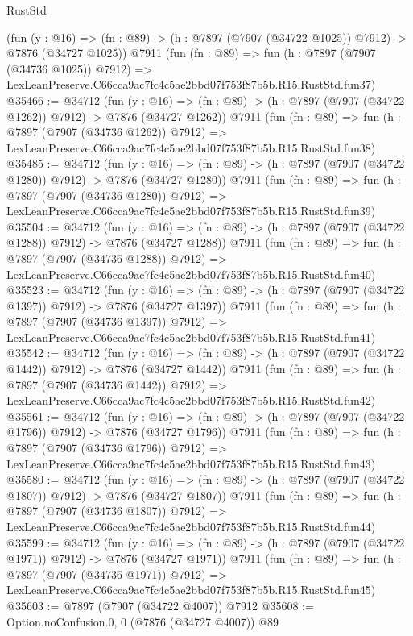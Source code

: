 \begin{lexlean}{RustStd}
\begin{coremodule}
    (fun (y : @16) =>
    (fn : @89) -> (h : @7897 (@7907 (@34722 @1025)) @7912) -> @7876 (@34727 @1025))
    @7911
    (fun (fn : @89) =>
    fun (h : @7897 (@7907 (@34736 @1025)) @7912) =>
    LexLeanPreserve.C66cca9ac7fc4c5ae2bbd07f753f87b5b.R15.RustStd.fun37)
@35466 := @34712
    (fun (y : @16) =>
    (fn : @89) -> (h : @7897 (@7907 (@34722 @1262)) @7912) -> @7876 (@34727 @1262))
    @7911
    (fun (fn : @89) =>
    fun (h : @7897 (@7907 (@34736 @1262)) @7912) =>
    LexLeanPreserve.C66cca9ac7fc4c5ae2bbd07f753f87b5b.R15.RustStd.fun38)
@35485 := @34712
    (fun (y : @16) =>
    (fn : @89) -> (h : @7897 (@7907 (@34722 @1280)) @7912) -> @7876 (@34727 @1280))
    @7911
    (fun (fn : @89) =>
    fun (h : @7897 (@7907 (@34736 @1280)) @7912) =>
    LexLeanPreserve.C66cca9ac7fc4c5ae2bbd07f753f87b5b.R15.RustStd.fun39)
@35504 := @34712
    (fun (y : @16) =>
    (fn : @89) -> (h : @7897 (@7907 (@34722 @1288)) @7912) -> @7876 (@34727 @1288))
    @7911
    (fun (fn : @89) =>
    fun (h : @7897 (@7907 (@34736 @1288)) @7912) =>
    LexLeanPreserve.C66cca9ac7fc4c5ae2bbd07f753f87b5b.R15.RustStd.fun40)
@35523 := @34712
    (fun (y : @16) =>
    (fn : @89) -> (h : @7897 (@7907 (@34722 @1397)) @7912) -> @7876 (@34727 @1397))
    @7911
    (fun (fn : @89) =>
    fun (h : @7897 (@7907 (@34736 @1397)) @7912) =>
    LexLeanPreserve.C66cca9ac7fc4c5ae2bbd07f753f87b5b.R15.RustStd.fun41)
@35542 := @34712
    (fun (y : @16) =>
    (fn : @89) -> (h : @7897 (@7907 (@34722 @1442)) @7912) -> @7876 (@34727 @1442))
    @7911
    (fun (fn : @89) =>
    fun (h : @7897 (@7907 (@34736 @1442)) @7912) =>
    LexLeanPreserve.C66cca9ac7fc4c5ae2bbd07f753f87b5b.R15.RustStd.fun42)
@35561 := @34712
    (fun (y : @16) =>
    (fn : @89) -> (h : @7897 (@7907 (@34722 @1796)) @7912) -> @7876 (@34727 @1796))
    @7911
    (fun (fn : @89) =>
    fun (h : @7897 (@7907 (@34736 @1796)) @7912) =>
    LexLeanPreserve.C66cca9ac7fc4c5ae2bbd07f753f87b5b.R15.RustStd.fun43)
@35580 := @34712
    (fun (y : @16) =>
    (fn : @89) -> (h : @7897 (@7907 (@34722 @1807)) @7912) -> @7876 (@34727 @1807))
    @7911
    (fun (fn : @89) =>
    fun (h : @7897 (@7907 (@34736 @1807)) @7912) =>
    LexLeanPreserve.C66cca9ac7fc4c5ae2bbd07f753f87b5b.R15.RustStd.fun44)
@35599 := @34712
    (fun (y : @16) =>
    (fn : @89) -> (h : @7897 (@7907 (@34722 @1971)) @7912) -> @7876 (@34727 @1971))
    @7911
    (fun (fn : @89) =>
    fun (h : @7897 (@7907 (@34736 @1971)) @7912) =>
    LexLeanPreserve.C66cca9ac7fc4c5ae2bbd07f753f87b5b.R15.RustStd.fun45)
@35603 := @7897 (@7907 (@34722 @4007)) @7912
@35608 := Option.noConfusion.{0, 0} (@7876 (@34727 @4007)) @89

\end{coremodule}
\end{lexlean}
